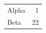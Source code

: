 \documentclass[aspectratio=169]{beamer}
\begin{document}
\begin{frame}[plain,t]
\small\begin{tabular}{lr}\toprule Alpha&1\\Beta&22\\\bottomrule\end{tabular}
\end{frame}
\end{document}
